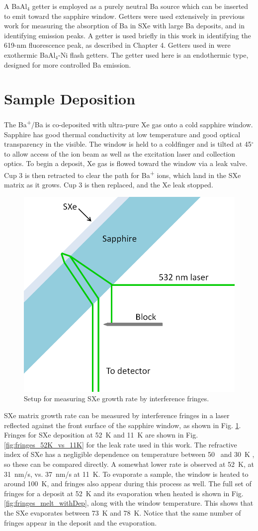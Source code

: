 A BaAl$_{4}$ getter is employed as a purely neutral Ba source which can be inserted to emit toward the sapphire window.  Getters were used extensively in previous work \cite{Brian} for measuring the absorption of Ba in SXe with large Ba deposits, and in identifying emission peaks.  A getter is used briefly in this work in identifying the 619-nm fluorescence peak, as described in Chapter 4.  Getters used in \cite{Brian} were exothermic BaAl$_{4}$-Ni flash getters.  The getter used here is an endothermic type, designed for more controlled Ba emission.  

\section{Sample Deposition}

The Ba\textsuperscript{+}/Ba is co-deposited with ultra-pure Xe gas onto a cold sapphire window.  Sapphire has good thermal conductivity at low temperature and good optical transparency in the visible.  The window is held to a coldfinger and is tilted at 45$^{\circ}$ to allow access of the ion beam as well as the excitation laser and collection optics.  To begin a deposit, Xe gas is flowed toward the window via a leak valve.  Cup 3 is then retracted to clear the path for Ba\textsuperscript{+} ions, which land in the SXe matrix as it grows.  Cup 3 is then replaced, and the Xe leak stopped.

\begin{figure} %
        \centering
                \includegraphics[width=.4\textwidth]{figures/fringe_setup.png}
                \caption{Setup for measuring SXe growth rate by interference fringes.}
\label{fig:fringe_setup}
\end{figure}

SXe matrix growth rate can be measured by interference fringes in a laser reflected against the front surface of the sapphire window, as shown in Fig. \ref{fig:fringe_setup}.  Fringes for SXe deposition at 52~K and 11~K are shown in Fig. \ref{fig:fringes_52K_vs_11K} for the leak rate used in this work.  The refractive index of SXe has a negligible dependence on temperature between 50~ and 30~K \cite{SXeIndex}, so these can be compared directly.  A somewhat lower rate is observed at 52~K, at 31~nm/s, vs. 37~nm/s at 11~K.  To evaporate a sample, the window is heated to around 100~K, and fringes also appear during this process as well.  The full set of fringes for a deposit at 52~K and its evaporation when heated is shown in Fig. \ref{fig:fringes_melt_withDep}, along with the window temperature.  This shows that the SXe evaporates between 73~K and 78~K.  Notice that the same number of fringes appear in the deposit and the evaporation.

